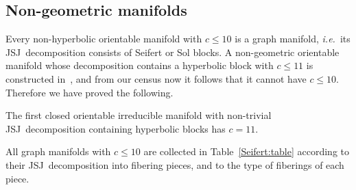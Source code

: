 \documentclass[10pt]{article}      %
\newcommand{\JSJ}{{\rm JSJ}}
\begin{document}
\subsection{Non-geometric manifolds}
Every non-hyperbolic orientable manifold with $c\leqslant 10$ is a graph manifold,
\emph{i.e.}~its \JSJ\ decomposition consists of Seifert or Sol blocks. 
A non-geometric orientable 
manifold whose decomposition contains a hyperbolic block with $c\leqslant 11$
is constructed in~\cite{AmMa}, and from our census now it follows that it cannot
have $c\leqslant 10$. Therefore we have proved the following.
\begin{theorem} The first closed orientable irreducible manifold with non-trivial \JSJ\ decomposition
containing hyperbolic blocks has $c=11$.
\end{theorem}
All graph manifolds with $c\leqslant 10$ are collected in Table~\ref{Seifert:table} according to 
their \JSJ\ decomposition into fibering pieces, and to the type of fiberings of each piece.
\end{document}
